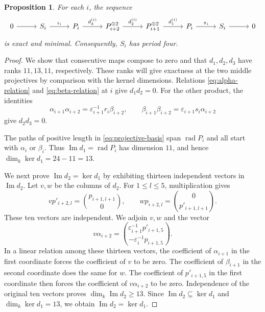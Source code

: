 \documentclass[a4paper,reqno,10pt]{amsart}
\newtheorem{proposition}[theorem]{Proposition}
\theoremstyle{definition}
\numberwithin{equation}{section}
\newcommand{\kfield}{k}
\newcommand{\rad}{\operatorname{rad}}
\newcommand{\im}{\operatorname{Im}}
\begin{document}
\begin{proposition}
\label{prop:simple-resolution}
For each $i$, the sequence
\[
\begin{tikzcd}[column sep=2.8em]
0 \arrow[r] &
S_i \arrow[r,"\iota_i"] &
P_i \arrow[r,"d_3^{(i)}"] &
P_{i+2}^{\oplus2} \arrow[r,"d_2^{(i)}"] &
P_{i+1}^{\oplus2} \arrow[r,"d_1^{(i)}"] &
P_i \arrow[r,"\pi_i"] &
S_i \arrow[r] &
0
\end{tikzcd}
\]
is exact and minimal. Consequently, $S_i$ has period four.
\end{proposition}

\begin{proof}
We show that consecutive maps compose to zero and that $d_1,d_2,d_3$
have ranks $11,13,11$, respectively. These ranks will give exactness
at the two middle projectives by comparison with the kernel dimensions.
Relations \eqref{eq:alpha-relation} and \eqref{eq:beta-relation}
at $i$ give $d_1d_2=0$.
For the other product, the identities
\[
 \alpha_{i+1}\alpha_{i+2}
 =\varepsilon_{i+1}^{-1}r_i\beta_{i+2},
 \qquad
 \beta_{i+1}\beta_{i+2}
 =\varepsilon_{i+1}s_i\alpha_{i+2}
\]
give $d_2d_3=0$.

The paths of positive length in \eqref{eq:projective-basis} span
$\rad P_i$ and all start with $\alpha_i$ or $\beta_i$. Thus
$\im d_1=\rad P_i$ has dimension $11$, and hence
$\dim_\kfield\ker d_1=24-11=13$.

We next prove $\im d_2=\ker d_1$ by exhibiting thirteen independent
vectors in $\im d_2$. Let $v,w$ be the columns of $d_2$.
For $1\leq l\leq5$, multiplication gives
\[
 v p'_{i+2,l}=\binom{p_{i+1,l+1}}{0},
 \qquad
 w p_{i+2,l}=\binom{0}{p'_{i+1,l+1}}.
\]
These ten vectors are independent. We adjoin $v,w$ and the vector
\[
 v\alpha_{i+2}
 =\binom{\varepsilon_{i+1}^{-1}p'_{i+1,5}}
            {-\varepsilon_i^{-1}p_{i+1,5}}.
\]
In a linear relation among these thirteen vectors, the coefficient of
$\alpha_{i+1}$ in the first coordinate forces the coefficient of $v$ to
be zero. The coefficient of $\beta_{i+1}$ in the second coordinate does
the same for $w$. The coefficient of $p'_{i+1,5}$ in the first coordinate
then forces the coefficient of $v\alpha_{i+2}$ to be zero. Independence
of the original ten vectors proves $\dim_\kfield\im d_2\geq13$.
Since $\im d_2\subseteq\ker d_1$ and $\dim_\kfield\ker d_1=13$,
we obtain $\im d_2=\ker d_1$.


\end{proof}
\end{document}
